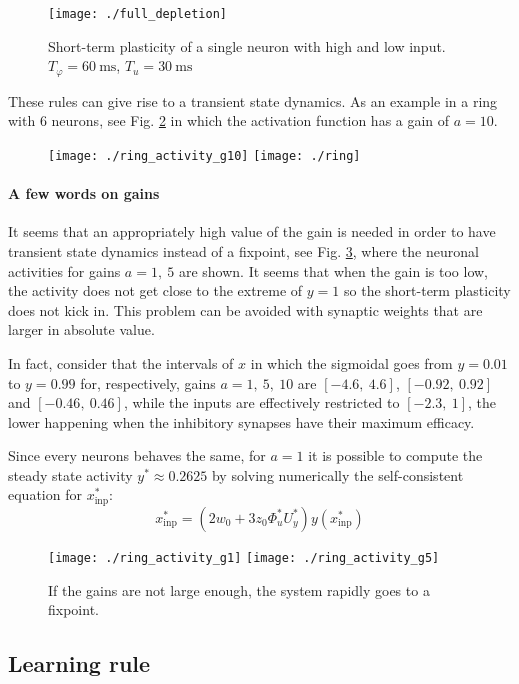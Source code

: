 \documentclass[12pt,a4paper]{article}
\begin{document}
		\begin{figure}
			\centering
			\texttt{[image: ./full\_depletion]}
			\caption{Short-term plasticity of a single neuron with high and low input. $T_\varphi=60 \ \text{ms}$, $T_u = 30 \ \text{ms}$}
			\label{fig:full_depletion}
		\end{figure}
		
		These rules can give rise to a transient state dynamics. As an example in a ring with 6 neurons, see Fig. \ref{fig:ring_activity} in which the activation function has a gain of $a=10$.
		
		\begin{figure}
			\centering

			\texttt{[image: ./ring\_activity\_g10]}
			\texttt{[image: ./ring]}
			\caption{}
			\label{fig:ring_activity}
		\end{figure}
		
		\paragraph{A few words on gains}
		It seems that an appropriately high value of the gain is needed in order to have transient state dynamics instead of a fixpoint, see Fig. \ref{fig:low_gain}, where the neuronal activities for gains $a=1,\ 5$ are shown. It seems that when the gain is too low, the activity does not get close to the extreme of $y = 1$ so the short-term plasticity does not kick in. This problem can be avoided with synaptic weights that are larger in absolute value. 
		
		In fact, consider that the intervals of $x$ in which the sigmoidal goes from $y=0.01$ to $y = 0.99$ for, respectively, gains $a = 1, \ 5, \ 10$ are $\left[-4.6,\ 4.6\right]$, $\left[-0.92,\ 0.92\right]$ and $\left[-0.46,\ 0.46\right]$, while the inputs are effectively restricted to $\left[-2.3,\ 1\right]$, the lower happening when the inhibitory synapses have their maximum efficacy.
		
		Since every neurons behaves the same, for $a=1$ it is possible to compute the steady state activity $y^* \approx 0.2625$ by solving numerically the self-consistent equation for $x_{\text{inp}}^*$:
		\begin{equation}
			x_{\text{inp}}^* = \left(2w_0 + 3 z_0 \varPhi_u^* U_y^* \right) y\left(x_{\text{inp}}^* \right)
		\end{equation}
		
		\begin{figure}
			\texttt{[image: ./ring\_activity\_g1]}
			\texttt{[image: ./ring\_activity\_g5]}
			\caption{If the gains are not large enough, the system rapidly goes to a fixpoint.}
			\label{fig:low_gain}
		\end{figure}
		
		\subsection{Learning rule}
		
		
		\newpage
		\printbibliography
\end{document}
